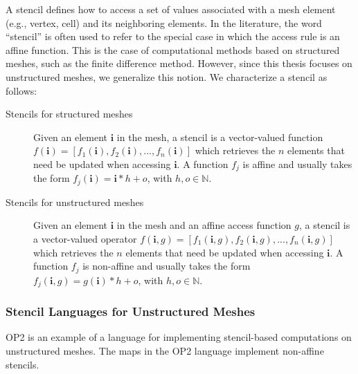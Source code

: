 A stencil defines how to access a set of values associated with a mesh element (e.g., vertex, cell) and its neighboring elements. In the literature, the word ``stencil'' is often used to refer to the special case in which the access rule is an affine function. This is the case of computational methods based on structured meshes, such as the finite difference method. However, since this thesis focuses on unstructured meshes, we generalize this notion. We characterize a stencil as follows:

\begin{description}
\item[Stencils for structured meshes] Given an element $\boldsymbol{i}$ in the mesh, a stencil is a vector-valued function $f(\boldsymbol{i}) = [f_1(\boldsymbol{i}), f_2(\boldsymbol{i}), ..., f_n(\boldsymbol{i})]$ which retrieves the $n$ elements that need be updated when accessing $\boldsymbol{i}$. A function $f_j$ is affine and usually takes the form $f_j(\boldsymbol{i}) = \boldsymbol{i}*h + o$, with $h, o \in \mathbb{N}$.
\item[Stencils for unstructured meshes] Given an element $\boldsymbol{i}$ in the mesh and an affine access function $g$, a stencil is a vector-valued operator $f(\boldsymbol{i}, g) = [f_1(\boldsymbol{i}, g), f_2(\boldsymbol{i}, g), ..., f_n(\boldsymbol{i}, g)]$ which retrieves the $n$ elements that need be updated when accessing $\boldsymbol{i}$. A function $f_j$ is non-affine and usually takes the form $f_j(\boldsymbol{i}, g) = g(\boldsymbol{i})*h + o$, with $h, o \in \mathbb{N}$.
\end{description}

\subsubsection{Stencil Languages for Unstructured Meshes}
OP2 is an example of a language for implementing stencil-based computations on unstructured meshes. The maps in the OP2 language implement non-affine stencils. 

